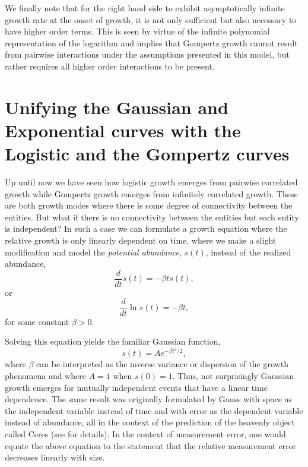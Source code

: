 \documentclass{article}
\begin{document}
We finally note that for the right hand side to exhibit asymptotically infinite growth rate at the onset of growth, it is not only sufficient but also necessary to have higher order terms. This is seen by virtue of the infinite polynomial representation of the logarithm and implies that Gompertz growth cannot result from pairwise interactions under the assumptions presented in this model, but rather requires all higher order interactions to be present.

\section{Unifying the Gaussian and Exponential curves with the Logistic and the Gompertz curves}

Up until now we have seen how logistic growth emerges from pairwise correlated growth while Gompertz growth emerges from infinitely correlated growth. These are both growth modes where there is some degree of connectivity between the entities. But what if there is no connectivity between the entities but each entity is independent? In such a case we can formulate a growth equation where the relative growth is only linearly dependent on time, where we make a slight modification and model the \textit{potential abundance}, $s(t)$, instead of the realized abundance,
\begin{equation}
  \frac{d}{dt}s(t) = - \beta t s(t),
\end{equation}
or 
\begin{equation}
  \frac{d}{dt}\ln s(t) = - \beta t,
\end{equation}
for some constant $\beta>0$. 
 
Solving this equation yields the familiar Gaussian function, 
\begin{equation}
  s(t) = A e^{ - \beta t^2 / 2},
\end{equation}
where $\beta$ can be interpreted as the inverse variance or dispersion of the growth phenomena and where $A=1$ when $s(0)=1$. Thus, not surprisingly Gaussian growth emerges for mutually independent events that have a linear time dependence. The same result was originally formulated by Gauss with space as the independent variable instead of time and with error as the dependent variable instead of abundance, all in the context of the prediction of the heavenly object called Ceres \cite{gauss1857theory} (see \cite{stahl2006evolution} for details). In the context of measurement error, one would equate the above equation to the statement that the relative measurement error decreases linearly with size. 
\end{document}
